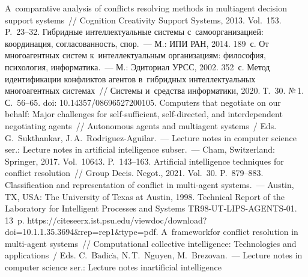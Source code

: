 \begin{multicols}{2}
{\small\frenchspacing
 {%
 \begin{thebibliography}{99}
   A~comparative analysis of conflicts 
resolving methods in multiagent decision support systems~// Cognition Creativity Support 
Systems, 2013. Vol.~153. P.~23--32.
   Гибридные интеллектуальные 
системы с~самоорганизацией: координация, согласованность, спор.~--- М.: ИПИ РАН, 2014. 
189~с.
   От многоагентных сис\-тем к~интеллектуальным организациям: 
философия, психология, информатика.~--- М.: Эдиториал УРСС, 2002. 352~с.
   Метод идентификации конфликтов агентов 
в~гибридных интеллектуальных многоагентных сис\-те\-мах~// Сис\-те\-мы и~средства 
информатики, 2020. Т.~30. №\,1. С.~56--65. doi: 10.14357/08696527200105.
   Computers that 
negotiate on our behalf: Major challenges for self-sufficient, self-directed, and interdependent 
negotiating agents~// {Autonomous agents and multiagent systems}~/ Eds. G.~Sukthankar,  
J.\,A.~Rodriguez-Aguilar.~--- Lecture notes in computer science ser.: Lecture notes in artificial 
intelligence subser.~--- Cham, Switzerland: Springer, 2017. Vol.~10643. P.~143--163.
   Artificial intelligence techniques for 
conflict resolution~// Group Decis. Negot., 2021. Vol.~30. P.~879--883.
   Classification and representation of 
conflict in multi-agent systems.~--- Austin, TX, USA: The University of Texas at Austin, 
1998. Technical Report of the Laboratory for Intelligent Processes and 
Systems TR98-UT-LIPS-AGENTS-01.
13~p. {\sf https://citeseerx.ist.psu.edu/viewdoc/download?\linebreak  doi=10.1.1.35.3694\&rep=rep1\&type=pdf}.
   A~framework\linebreak for conflict resolution in 
multi-agent systems~// Computational collective intelligence: Technologies and applications~/
Eds. C.~B$\grave{\mbox{a}}$dic$\grave{\mbox{a}}$, N.\,T.~Nguyen, 
M.~Brezovan.~--- Lecture notes in computer science ser.: Lecture notes in\linebreak artificial intelligence 

\end{thebibliography}}}
\end{multicols}
